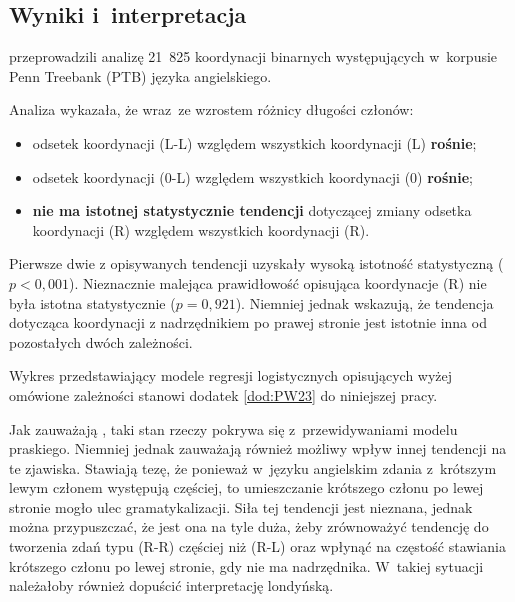 





\subsection{Wyniki i~interpretacja}

\cite{przepiorkowski2023conjunct} przeprowadzili analizę 21~825 koordynacji binarnych występujących w~korpusie Penn Treebank (PTB) języka angielskiego.

Analiza wykazała, że wraz~ze wzrostem różnicy długości członów:
\begin{itemize}
\item odsetek koordynacji (L-L) względem wszystkich koordynacji (L) \textbf{rośnie};
\item odsetek koordynacji (0-L) względem wszystkich koordynacji (0) \textbf{rośnie};
\item \textbf{nie ma istotnej statystycznie tendencji} dotyczącej zmiany odsetka koordynacji (R) względem wszystkich koordynacji (R).
\end{itemize}

Pierwsze dwie z opisywanych tendencji uzyskały wysoką istotność statystyczną ($p<0,001$). Nieznacznie malejąca prawidłowość opisująca koordynacje (R) nie była istotna statystycznie ($p = 0,921$). Niemniej jednak \cite{przepiorkowski2023conjunct} wskazują, że tendencja dotycząca koordynacji z nadrzędnikiem po prawej stronie jest istotnie inna od pozostałych dwóch zależności. 

Wykres przedstawiający modele regresji logistycznych opisujących wyżej omówione zależności stanowi dodatek \ref{dod:PW23} do niniejszej pracy.

Jak zauważają \cite{przepiorkowski2023conjunct}, taki stan rzeczy pokrywa się z~przewidywaniami modelu praskiego. Niemniej jednak zauważają również możliwy wpływ innej tendencji na te zjawiska. Stawiają tezę, że ponieważ w~języku angielskim zdania z~krótszym lewym członem występują częściej, to umieszczanie krótszego członu po lewej stronie mogło ulec gramatykalizacji. Siła tej tendencji jest nieznana, jednak można przypuszczać, że jest ona na tyle duża, żeby zrównoważyć tendencję do tworzenia zdań typu (R-R) częściej niż (R-L) oraz wpłynąć na częstość stawiania krótszego członu po lewej stronie, gdy nie ma nadrzędnika. W~takiej sytuacji należałoby również dopuścić interpretację londyńską.

